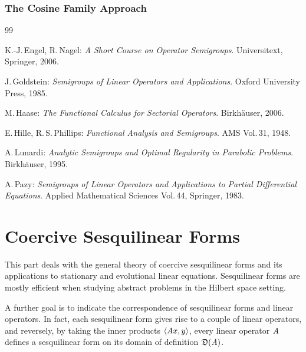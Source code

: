 \documentclass[11pt,twoside]{article}
\begin{document}
\section{The Cosine Family Approach}

\vspace{5mm}
\begin{thebibliography}{99}
\begin{small}

  K.-J.\,Engel, R.\,Nagel:
\textit{A Short Course on Operator Semigroups}.
Universitext, Springer, 2006.

 J.\,Goldstein:
\textit{Semigroups of Linear Operators and Applications}.
Oxford University Press, 1985.

 M.\,Haase:
\textit{The Functional Calculus for Sectorial Operators}.
Birk\-h\"{a}user, 2006.

 E.\,Hille, R.\,S.\,Phillips:
\textit{Functional Analysis and Semigroups}.
AMS Vol.\,31, 1948.

 A.\,Lunardi:
\textit{Analytic Semigroups and Optimal Regularity in Parabolic Problems}.
Birk\-h\"{a}user, 1995.

 A.\,Pazy:
\textit{Semigroups of Linear Operators
        and Applications to Partial Differential Equations}.
Applied Mathematical Sciences Vol.\,44, Springer, 1983.

\end{small}
\end{thebibliography}

\newpage
\thispagestyle{empty}
\part{Coercive Sesquilinear Forms}                                             %
This part deals with the general theory of coercive sesquilinear forms
and its applications to stationary and evolutional linear equations.
Sesquilinear forms are mostly efficient
when studying abstract problems in the Hilbert space setting.

A further goal is to indicate the correspondence of
sesquilinear forms and linear operators.
In fact,
each sesquilinear form gives rise to a couple of linear operators,
and reversely,
by taking the inner products $\langle \mathit{A} x,y \rangle$,
every linear operator $\mathit{A}$ defines a sesquilinear form
on its domain of definition $\mathfrak{D}(\mathit{A})$.
\end{document}
